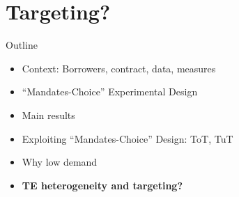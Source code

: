 \documentclass[9pt, aspectratio=169]{beamer}
\begin{document}
\section{Targeting?}



\begin{frame}{Outline}
     \large   
     \begin{itemize}
        \item Context: Borrowers, contract, data, measures
         \item \vfill ``Mandates-Choice'' Experimental Design
         \vfill\item Main results
          \vfill\item Exploiting ``Mandates-Choice'' Design: ToT, TuT
         \vfill\item Why low demand
         \vfill \item \textbf{TE heterogeneity and targeting?}
     \end{itemize}
\end{frame}
\end{document}
